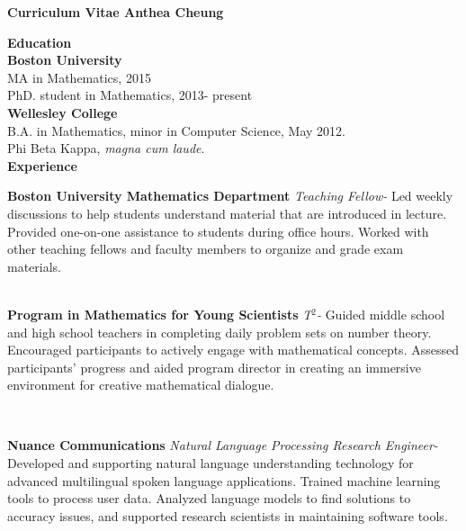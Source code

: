 \documentclass[letter, 11pt]{article}
\begin{document}
\textheight=11in
\flushleft

\LARGE\textbf{Curriculum Vitae \hspace{6.8cm} Anthea Cheung\\} \vspace{-1.65cm}

\vspace{2.5cm}


\Large \textbf{Education} \vspace{0.3cm}\\
\large \textbf{Boston University}\\
MA in Mathematics, 2015\\
PhD. student in Mathematics, 2013- present
\vspace{0.4cm}\\

\large \textbf{Wellesley College} \\
B.A. in Mathematics, minor in Computer Science, May 2012.\\
Phi Beta Kappa, \textit{magna cum laude}.
\vspace{0.4cm}\\

\Large \textbf{Experience}\vspace{0.4cm}\\

\parbox[l]{\textwidth}{
\large \textbf{Boston University Mathematics Department} 
\textit{Teaching Fellow- }Led weekly discussions to help students understand material that are introduced in lecture. Provided one-on-one assistance to students during office hours. Worked with other teaching fellows and faculty members to organize and grade exam materials. 
}
\vspace{0.4cm}\\
\large \textbf{Program in Mathematics for Young Scientists}
\textit{T$^2$- }
Guided middle school and high school teachers in completing daily problem sets on number theory. Encouraged participants to actively engage with mathematical concepts. Assessed participants' progress and aided program director in creating an immersive environment for creative mathematical dialogue.

  \vspace{0.4cm}\\
\parbox[l]{\textwidth}{
\large \textbf{Nuance Communications} 
\textit{Natural Language Processing Research Engineer- } Developed and supporting natural language understanding technology for advanced multilingual spoken language applications. Trained machine learning tools to process user data. Analyzed language models to find solutions to accuracy issues, and supported research scientists in maintaining software tools.  
}
\vspace{0.4cm}\\
\end{document}
